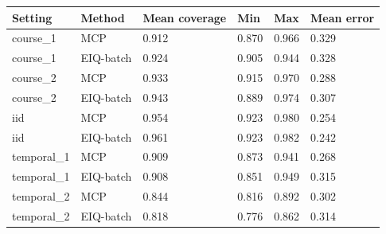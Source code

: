 \begin{tabular}{llllll}
\toprule
Setting & Method & Mean coverage & Min & Max & Mean error\\
\midrule
course\_1 & MCP & 0.912 & 0.870 & 0.966 & 0.329\\
course\_1 & EIQ-batch & 0.924 & 0.905 & 0.944 & 0.328\\
course\_2 & MCP & 0.933 & 0.915 & 0.970 & 0.288\\
course\_2 & EIQ-batch & 0.943 & 0.889 & 0.974 & 0.307\\
iid & MCP & 0.954 & 0.923 & 0.980 & 0.254\\
iid & EIQ-batch & 0.961 & 0.923 & 0.982 & 0.242\\
temporal\_1 & MCP & 0.909 & 0.873 & 0.941 & 0.268\\
temporal\_1 & EIQ-batch & 0.908 & 0.851 & 0.949 & 0.315\\
temporal\_2 & MCP & 0.844 & 0.816 & 0.892 & 0.302\\
temporal\_2 & EIQ-batch & 0.818 & 0.776 & 0.862 & 0.314\\
\bottomrule
\end{tabular}